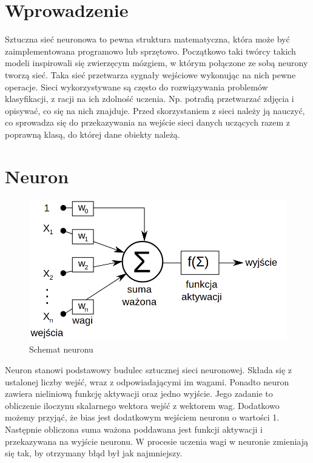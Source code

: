 \documentclass{report}
\begin{document}
    \section{Wprowadzenie}

    Sztuczna sieć neuronowa to pewna struktura matematyczna, która może być zaimplementowana programowo lub sprzętowo.
    Początkowo taki twórcy takich modeli inspirowali się zwierzęcym mózgiem, w którym połączone ze sobą neurony tworzą sieć.
    Taka sieć przetwarza sygnały wejściowe wykonując na nich pewne operacje.
    Sieci wykorzystywane są często do rozwiązywania problemów klasyfikacji, z racji na ich zdolność uczenia.
    Np. potrafią przetwarzać zdjęcia i opisywać, co się na nich znajduje.
    Przed skorzystaniem z sieci należy ją nauczyć, co sprowadza się do przekazywania na wejście sieci danych uczących razem z poprawną klasą, do której dane obiekty należą.

    \section{Neuron}

    \begin{figure}[H]
        \centering
        \includegraphics[scale=0.4]{./img/neuron.png}
        \caption{Schemat neuronu}
    \end{figure}

    Neuron stanowi podstawowy budulec sztucznej sieci neuronowej.
    Składa się z ustalonej liczby wejść, wraz z odpowiadającymi im wagami.
    Ponadto neuron zawiera nieliniową funkcję aktywacji oraz jedno wyjście.
    Jego zadanie to obliczenie iloczynu skalarnego wektora wejść z wektorem wag.
    Dodatkowo możemy przyjąć, że bias jest dodatkowym wejściem neuronu o wartości 1.
    Następnie obliczona suma ważona poddawana jest funkcji aktywacji i przekazywana na wyjście neuronu.
    W procesie uczenia wagi w neuronie zmieniają się tak, by otrzymany błąd był jak najmniejszy.
\end{document}
